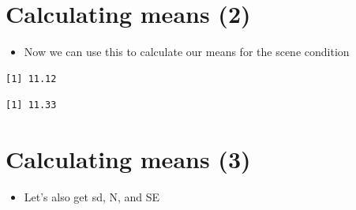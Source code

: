\documentclass[]{article}
\newenvironment{Shaded}{}{}
\newcommand{\KeywordTok}[1]{\textcolor[rgb]{0.00,0.44,0.13}{\textbf{{#1}}}}
\newcommand{\StringTok}[1]{\textcolor[rgb]{0.25,0.44,0.63}{{#1}}}
\newcommand{\NormalTok}[1]{{#1}}
\begin{document}
\section{Calculating means (2)}\label{calculating-means-2-1}

\begin{itemize}
\itemsep1pt\parskip0pt
\item
  Now we can use this to calculate our means for the scene condition
\end{itemize}

\begin{Shaded}
\end{Shaded}

\begin{verbatim}
[1] 11.12
\end{verbatim}

\begin{Shaded}
\end{Shaded}

\begin{verbatim}
[1] 11.33
\end{verbatim}

\section{Calculating means (3)}\label{calculating-means-3}

\begin{itemize}
\itemsep1pt\parskip0pt
\item
  Let's also get sd, N, and SE
\end{itemize}

\begin{Shaded}
\end{Shaded}
\end{document}
